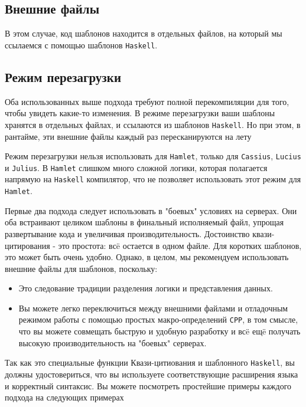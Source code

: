 \subsection {Внешние файлы}
В этом случае, код шаблонов находится в отдельных файлов, на который мы ссылаемся
с помощью шаблонов \texttt{Haskell}.

\subsection {Режим перезагрузки}
Оба использованных выше подхода требуют полной перекомпиляции для того, чтобы увидеть
какие-то изменения. В режиме перезагрузки ваши шаблоны хранятся в отдельных файлах,
и ссылаются из шаблонов \texttt{Haskell}. Но при этом, в рантайме, эти внешние файлы 
каждый раз пересканируются на лету

Режим перезагрузки нельзя использовать для \texttt{Hamlet}, только для \texttt{Cassius}, \texttt{Lucius} и \texttt{Julius}.
В \texttt{Hamlet} слишком много сложной логики, которая полагается напрямую на \texttt{Haskell}
компилятор, что не позволяет использовать этот режим для \texttt{Hamlet}.

Первые два подхода следует использовать в "боевых" условиях на серверах.
Они оба встраивают целиком шаблоны в финальный исполняемый файл, упрощая 
развертывание кода и увеличивая производительность.
Достоинство квази-цитирования - это простота: всë остается в одном файле.
Для коротких шаблонов, это может быть очень удобно. Однако, в целом, мы рекомендуем
использовать внешние файлы для шаблонов, поскольку:

\begin{itemize}
\item Это следование традиции разделения логики и представления данных.
\item Вы можете легко переключиться между внешними файлами и отладочным режимом
работы с помощью простых макро-определений \texttt{CPP}, в том смысле, что вы
можете совмещать быструю и удобную разработку и всë ещë получать высокую
производительность на "боевых" серверах.
\end{itemize}

Так как это специальные функции Квази-цитиования и шаблонного \texttt{Haskell}, вы 
должны удостовериться, что вы используете соответствующие расширения языка
и корректный синтаксис. Вы можете посмотреть простейшие примеры каждого подхода
на следующих примерах

